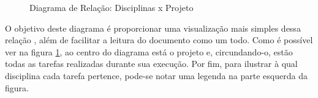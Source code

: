 \begin{figure}[!htb]
    \centering
    \caption{Diagrama de Relação: Disciplinas x Projeto}
    \label{fig:areas_envolvidas}
\end{figure}

O objetivo deste diagrama é proporcionar uma visualização mais simples dessa relação , além de facilitar a leitura do documento como um todo. Como é possível ver na figura \ref{fig:areas_envolvidas}, ao centro do diagrama está o projeto e, circundando-o, estão todas as tarefas realizadas durante sua execução. Por fim, para ilustrar à qual disciplina cada tarefa pertence, pode-se notar uma legenda na parte esquerda da figura.